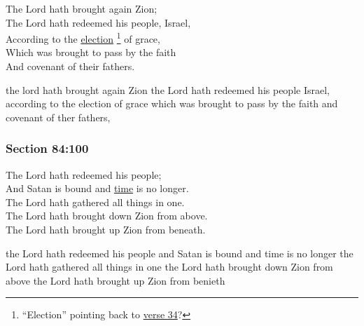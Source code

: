 		The Lord hath brought again Zion; \\
		The Lord hath redeemed his people, Israel, \\
		According to the \hyperref[ELECTION]{election}%
			\footnote{%
				``Election'' pointing back to \hyperref[DC84-34]{verse 34}?
				}
		of grace, \\
		Which was brought to pass by the faith \\
		And covenant of their fathers. \\

		\begin{framed}
		\scriptsize
			\begin{compactdesc}
				\item[JSP] the lord hath brought again Zion the Lord hath redeemed his people Israel, according to the election of grace which was brought to pass by the faith and covenant of ther fathers,
			\end{compactdesc}
		\end{framed}

	\subsubsection{Section 84:100} %
		\label{DC84-100}

		The Lord hath redeemed his people;          \\
		And Satan is bound and \hyperref[TIME]{time} is no longer.   \\
		The Lord hath gathered all things in one.   \\
		The Lord hath brought down Zion from above. \\
		The Lord hath brought up Zion from beneath. \\

		\begin{framed}
		\scriptsize
			\begin{compactdesc}
				\item[JSP] the Lord hath redeemed his people and Satan is bound and time is no longer the Lord hath gathered all things in one the Lord hath brought down Zion from above the Lord hath brought up Zion from benieth
			\end{compactdesc}
		\end{framed}


